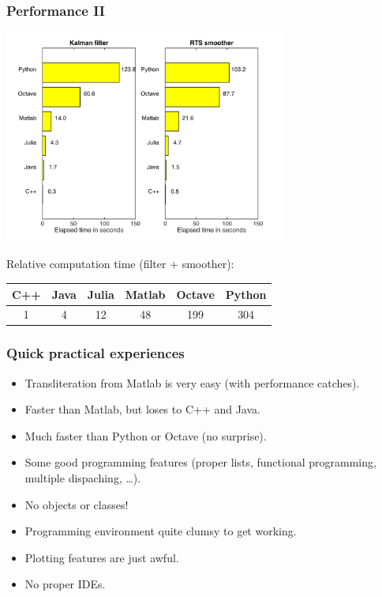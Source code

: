 \documentclass[xcolor=svgnames,english,presentation]{beamer}
\begin{document}
\begin{frame}
  \frametitle{Performance II}
  \centering
  \includegraphics[width=0.7\textwidth]{kf-benchmark/times}

  \alert{Relative computation time (filter + smoother):}

  \begin{tabular}{|c|c|c|c|c|c|}
  \hline
  {\bf C++}     & {\bf Java}    & {\bf Julia}   & {\bf Matlab}  & {\bf Octave}  & {\bf Python}  \\ 
  \hline
1       & 4       & 12      & 48      & 199     & 304 \\
\hline
  \end{tabular}
\end{frame}

\begin{frame}
  \frametitle{Quick practical experiences}

  \begin{itemize}[<+->]
  \item[\textcolor{green}\checkmark] \alert{Transliteration from Matlab} is very easy (with performance catches).
  \item[\textcolor{green}\checkmark] Faster than \alert{Matlab}, but loses to \alert{C++ and Java}.
  \item[\textcolor{green}\checkmark] Much faster than \alert{Python or Octave} (no surprise).
  \item[\textcolor{green}\checkmark] Some \alert{good programming features} (proper lists, functional programming, multiple dispaching, \ldots).
  \item[\textcolor{red}\checkmark] \alert{No objects or classes!}
  \item[\textcolor{red}\checkmark] Programming environment quite \alert{clumsy to get working}.
  \item[\textcolor{red}\checkmark] \alert{Plotting features} are just awful.
  \item[\textcolor{red}\checkmark] No proper \alert{IDEs}.
  \end{itemize}

\end{frame}
\end{document}
